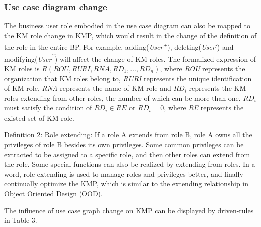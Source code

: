 \documentclass{elsarticle}
\begin{document}
\subsubsection{Use case diagram change}


\textrm{The business user role embodied in the use case diagram can also
be mapped to the KM role change in KMP, which would result in the
change of the definition of the role in the entire BP. For example,
adding(}\textrm{\textit{User}}\textrm{\textit{\textsuperscript{+}}}\textrm{),
deleting(}\textrm{\textit{User}}\textrm{\textit{\textsuperscript{{}-}}}\textrm{)
and
modifying(}\textrm{\textit{User}}\textrm{\textit{\textsuperscript{\^{}}}}\textrm{)
will affect the change of KM roles. The formalized expression of KM
roles is }$R(ROU,RURI,RNA,
RD_1,\ldots,RD_n)$\textrm{, where }\textrm{\textit{ROU}}\textrm{ represents
the organization that KM roles belong to,
}\textrm{\textit{RURI}}\textrm{ represents the unique identification of
KM role, }\textrm{\textit{RNA }}\textrm{represents the name of KM role
and }$RD_i$\textrm{ represents the KM roles extending
from other roles, the number of which can be more than
one.} $RD_i$\textrm{ must satisfy the
condition of }$RD_i{\in}RE$
\textrm{or }$RD_i=0$,\textrm{ where
}\textrm{\textit{RE}}\textrm{ represents the existed set of KM role.}


\textrm{Definition 2: Role extending: If a role A extends from role B,
role A owns all the privileges of role B besides its own privileges.
Some common privileges can be extracted to be assigned to a specific
role, and then other roles can extend from the role. Some special functions can also be realized by
extending from roles. In a word, role extending is used to manage roles
and privileges better, and finally continually optimize the KMP, which
is similar to the extending relationship in Object Oriented Design
(OOD).}


\textrm{The influence of use case graph change on KMP can be displayed
by driven-rules in Table 3.}
\end{document}
